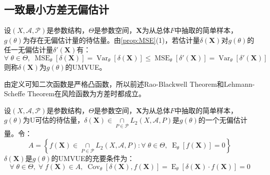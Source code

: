 \subsection{一致最小方差无偏估计}
\begin{definition}
	设$(X,\mathscr{A},\mathscr{P})$是参数结构，$\Theta$是参数空间，$\mathbf{X}$为从总体$F$中抽取的简单样本，$g(\theta)$为存在无偏估计量的待估量。由\cref{prop:MSE}(1)，若估计量$\delta(\mathbf{X})$对$g(\theta)$的任一无偏估计量$\delta'(\mathbf{X})$有：
	\begin{equation*}
		\forall\;\theta\in\Theta,\;\operatorname{MSE}_{\theta}[\delta(\mathbf{X})]=\operatorname{Var}_{\theta}[\delta(\mathbf{X})]\leqslant\operatorname{MSE}_{\theta}[\delta'(\mathbf{X})]=\operatorname{Var}_{\theta}[\delta'(\mathbf{X})]
	\end{equation*}
	则称$\delta(\mathbf{X})$为$g(\theta)$的\gls{UMVUE}。
\end{definition}
\begin{note}
	由定义可知二次函数是严格凸函数，所以前述Rao-Blackwell Theorem和Lehmann-Scheffe Theorem在风险函数为方差时都成立。
\end{note}
\begin{theorem}\label{theo:UMVUE0UnbiasedEstimation}
	设$(X,\mathscr{A},\mathscr{P})$是参数结构，$\Theta$是参数空间，$\mathbf{X}$为从总体$F$中抽取的简单样本，$g(\theta)$为U可估的待估量，$\delta(\mathbf{X})\in\underset{P\in\mathscr{P}}{\cap}L_2(X,\mathscr{A},P)$是$g(\theta)$的一个无偏估计量。令：
	\begin{equation*}
		A=\left\{f(\mathbf{X})\in\underset{P\in\mathscr{P}}{\cap}L_2(X,\mathscr{A},P):\forall\;\theta\in\Theta,\;\operatorname{E}_{\theta}[f(\mathbf{X})]=0\right\}
	\end{equation*}
	$\delta(\mathbf{X})$是$g(\theta)$的UMVUE的充要条件为：
	\begin{equation*}
		\forall\;\theta\in\Theta,\;\forall\;f(\mathbf{X})\in A,\;\operatorname{Cov}_{\theta}[\delta(\mathbf{X}),f(\mathbf{X})]=\operatorname{E}_{\theta}[\delta(\mathbf{X})\cdot f(\mathbf{X})]=0
	\end{equation*}
\end{theorem}
